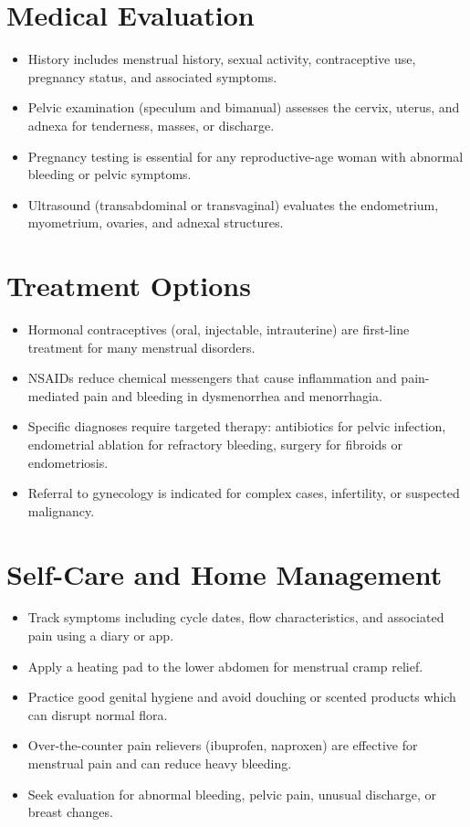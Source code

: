 \section*{Medical Evaluation}
\begin{itemize}
  \item History includes menstrual history, sexual activity, contraceptive use, pregnancy status, and associated symptoms.
  \item Pelvic examination (speculum and bimanual) assesses the cervix, uterus, and adnexa for tenderness, masses, or discharge.
  \item Pregnancy testing is essential for any reproductive-age woman with abnormal bleeding or pelvic symptoms.
  \item Ultrasound (transabdominal or transvaginal) evaluates the endometrium, myometrium, ovaries, and adnexal structures.
\end{itemize}

\section*{Treatment Options}
\begin{itemize}
  \item Hormonal contraceptives (oral, injectable, intrauterine) are first-line treatment for many menstrual disorders.
  \item NSAIDs reduce chemical messengers that cause inflammation and pain-mediated pain and bleeding in dysmenorrhea and menorrhagia.
  \item Specific diagnoses require targeted therapy: antibiotics for pelvic infection, endometrial ablation for refractory bleeding, surgery for fibroids or endometriosis.
  \item Referral to gynecology is indicated for complex cases, infertility, or suspected malignancy.
\end{itemize}

\section*{Self-Care and Home Management}
\begin{itemize}
  \item Track symptoms including cycle dates, flow characteristics, and associated pain using a diary or app.
  \item Apply a heating pad to the lower abdomen for menstrual cramp relief.
  \item Practice good genital hygiene and avoid douching or scented products which can disrupt normal flora.
  \item Over-the-counter pain relievers (ibuprofen, naproxen) are effective for menstrual pain and can reduce heavy bleeding.
  \item Seek evaluation for abnormal bleeding, pelvic pain, unusual discharge, or breast changes.
\end{itemize}

